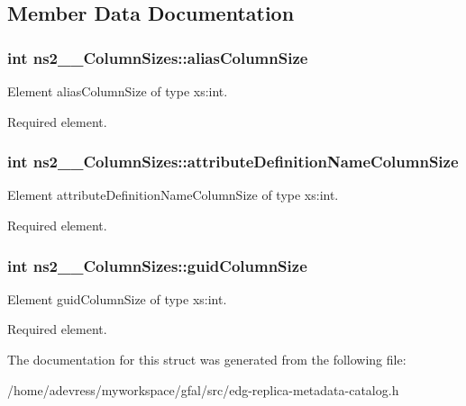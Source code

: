 \subsection{Member Data Documentation}
\subsubsection{\setlength{\rightskip}{0pt plus 5cm}int \bf{ns2\_\-\_\-Column\-Sizes::alias\-Column\-Size}}\label{structns2____ColumnSizes_2a8800420ff4f0d85c0369b29f0ded69}


Element alias\-Column\-Size of type xs:int. 

Required element. 
\subsubsection{\setlength{\rightskip}{0pt plus 5cm}int \bf{ns2\_\-\_\-Column\-Sizes::attribute\-Definition\-Name\-Column\-Size}}\label{structns2____ColumnSizes_9ecf64a73b2915d27e14620b0189b42a}


Element attribute\-Definition\-Name\-Column\-Size of type xs:int. 

Required element. 
\subsubsection{\setlength{\rightskip}{0pt plus 5cm}int \bf{ns2\_\-\_\-Column\-Sizes::guid\-Column\-Size}}\label{structns2____ColumnSizes_957af3eedc4d466d1e0b36167ba8d095}


Element guid\-Column\-Size of type xs:int. 

Required element. 

The documentation for this struct was generated from the following file:\begin{CompactItemize}
\item 
/home/adevress/myworkspace/gfal/src/edg-replica-metadata-catalog.h\end{CompactItemize}
